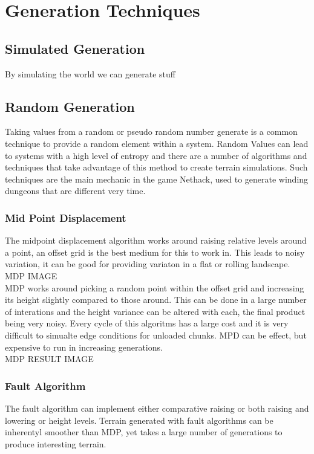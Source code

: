 \section{Generation Techniques}

\subsection{Simulated Generation}
By simulating the world we can generate stuff


\subsection{Random Generation}
Taking values from a random or pseudo random number generate is a common 
technique to provide a random element within a system. Random Values can lead to
systems with a high level of entropy and there are a number of algorithms and 
techniques that take advantage of this method to create terrain simulations. Such
techniques are the main mechanic in the game Nethack, used to generate winding
dungeons that are different very time.\\

\subsubsection*{Mid Point Displacement}
The midpoint displacement algorithm works around raising relative levels around a
point, an offset grid is the best medium for this to work in. This leads to noisy
variation, it can be good for providing variaton in a flat or rolling landscape.\\

MDP IMAGE\\

MDP works around picking a random point within the offset grid and increasing its
height slightly compared to those around. This can be done in a large number of 
interations and the height variance can be altered with each, the final product 
being very noisy. Every cycle of this algoritms has a large cost and it is very
difficult to simualte edge conditions for unloaded chunks. MPD can be effect, but
expensive to run in increasing generations.\\

MDP RESULT IMAGE\\

\subsubsection*{Fault Algorithm}
The fault algorithm can implement either comparative raising or both raising and
lowering or height levels. Terrain generated with fault algorithms can be 
inherentyl smoother than MDP, yet takes a large number of generations to produce
interesting terrain.\\

